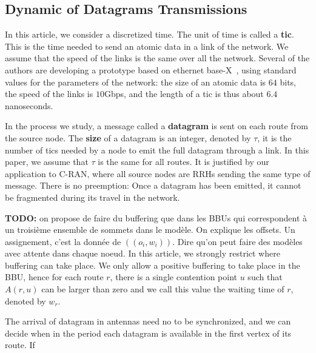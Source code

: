 \documentclass[10pt, conference, letterpaper]{IEEEtran}
\begin{document}
	 
	 
 \subsection{Dynamic of Datagrams Transmissions}
	    
 		In this article, we consider a discretized time. The unit of time is called a {\bf tic}. This is the time needed to send an atomic data in a link of the network. We assume that the speed of the links is the same over all the network. Several of the authors are developing a prototype based on ethernet base-X~\cite{ieee_8023}, using standard values for the parameters of the network: the size of an atomic data is $64$ bits, the speed of the links is $10$Gbps, and the length of a tic is thus about $6.4$ nanoseconds. 

        In the process we study, a message called a {\bf datagram} is sent on each route from the source node. The \textbf{size} of a datagram is an integer, denoted by $\tau$, it is the number of tics needed by a node to emit the full datagram through a link.  In this paper, we assume that $\tau$ is the same for all routes. It is justified by our application to C-RAN, where all source nodes are RRHs sending the same type of message. There is no preemption: Once a datagram has been emitted, it cannot be fragmented during its travel in the network. 


        \textbf{TODO:} on propose de faire du buffering que dans les BBUs qui correspondent à un troisième ensemble de sommets dans le modèle. On explique les offsets. Un assignement, c'est la donnée
        de $((o_i,w_i))$. Dire qu'on peut faire des modèles avec attente dans chaque noeud.
In this article, we strongly restrict where buffering can take place. We only allow a positive buffering to take place in the BBU, hence for each route 
        $r$, there is a single contention point $u$ such that $A(r,u)$ can be larger than zero and we call
        this value the waiting time of $r$, denoted by $w_r$. 

        The arrival of datagram in antennas need no to be synchronized, and we can decide when in the period
        each datagram is available in the first vertex of its route. If  
\end{document}
